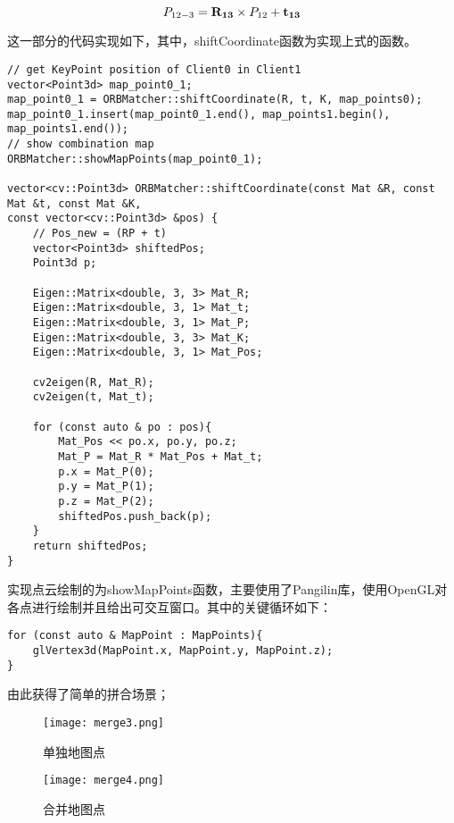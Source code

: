 \begin{equation}
P_{12-3}={\bf R_{13}} \times P_{12} + \bf{t_{13}}
\end{equation}

这一部分的代码实现如下，其中，shiftCoordinate函数为实现上式的函数。

\begin{verbatim}
// get KeyPoint position of Client0 in Client1
vector<Point3d> map_point0_1;
map_point0_1 = ORBMatcher::shiftCoordinate(R, t, K, map_points0);
map_point0_1.insert(map_point0_1.end(), map_points1.begin(), map_points1.end());
// show combination map
ORBMatcher::showMapPoints(map_point0_1);

vector<cv::Point3d> ORBMatcher::shiftCoordinate(const Mat &R, const Mat &t, const Mat &K,
const vector<cv::Point3d> &pos) {
    // Pos_new = (RP + t)
    vector<Point3d> shiftedPos;
    Point3d p;

    Eigen::Matrix<double, 3, 3> Mat_R;
    Eigen::Matrix<double, 3, 1> Mat_t;
    Eigen::Matrix<double, 3, 1> Mat_P;
    Eigen::Matrix<double, 3, 3> Mat_K;
    Eigen::Matrix<double, 3, 1> Mat_Pos;

    cv2eigen(R, Mat_R);
    cv2eigen(t, Mat_t);

    for (const auto & po : pos){
        Mat_Pos << po.x, po.y, po.z;
        Mat_P = Mat_R * Mat_Pos + Mat_t;
        p.x = Mat_P(0);
        p.y = Mat_P(1);
        p.z = Mat_P(2);
        shiftedPos.push_back(p);
    }
    return shiftedPos;
}
\end{verbatim}

实现点云绘制的为showMapPoints函数，主要使用了Pangilin库，使用OpenGL对各点进行绘制并且给出可交互窗口。其中的关键循环如下：

\begin{verbatim}
for (const auto & MapPoint : MapPoints){
    glVertex3d(MapPoint.x, MapPoint.y, MapPoint.z);
}
\end{verbatim}

由此获得了简单的拼合场景；

\begin{figure}[htbp]
	\centering
	\begin{minipage}[t]{0.45\columnwidth} %
		\centering
		\texttt{[image: merge3.png]}
		\caption{单独地图点}
		\label{merge1}
	\end{minipage}
	\begin{minipage}[t]{0.45\columnwidth}
		\centering
		\texttt{[image: merge4.png]}
		\caption{合并地图点}
		\label{merge2}
	\end{minipage}
\end{figure}









